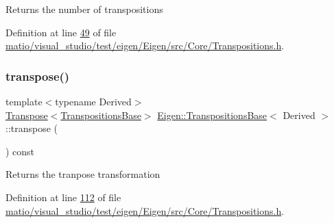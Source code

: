 \begin{DoxyReturn}{Returns}
the number of transpositions 
\end{DoxyReturn}


Definition at line \hyperlink{matio_2visual__studio_2test_2eigen_2_eigen_2src_2_core_2_transpositions_8h_source_l00049}{49} of file \hyperlink{matio_2visual__studio_2test_2eigen_2_eigen_2src_2_core_2_transpositions_8h_source}{matio/visual\+\_\+studio/test/eigen/\+Eigen/src/\+Core/\+Transpositions.\+h}.

\mbox{\label{class_eigen_1_1_transpositions_base_a2ddede41421797738fc58ee1074efb8f}} 
\subsubsection{\texorpdfstring{transpose()}{transpose()}\hspace{0.1cm}{\footnotesize\ttfamily [1/2]}}
{\footnotesize\ttfamily template$<$typename Derived$>$ \\
\hyperlink{group___core___module_class_eigen_1_1_transpose}{Transpose}$<$\hyperlink{class_eigen_1_1_transpositions_base}{Transpositions\+Base}$>$ \hyperlink{class_eigen_1_1_transpositions_base}{Eigen\+::\+Transpositions\+Base}$<$ Derived $>$\+::transpose (\begin{DoxyParamCaption}{ }\end{DoxyParamCaption}) const\hspace{0.3cm}{\ttfamily [inline]}}

\begin{DoxyReturn}{Returns}
the tranpose transformation 
\end{DoxyReturn}


Definition at line \hyperlink{matio_2visual__studio_2test_2eigen_2_eigen_2src_2_core_2_transpositions_8h_source_l00112}{112} of file \hyperlink{matio_2visual__studio_2test_2eigen_2_eigen_2src_2_core_2_transpositions_8h_source}{matio/visual\+\_\+studio/test/eigen/\+Eigen/src/\+Core/\+Transpositions.\+h}.

\mbox{\label{class_eigen_1_1_transpositions_base_a2ddede41421797738fc58ee1074efb8f}} 
